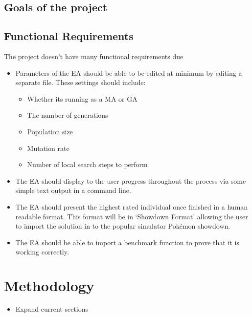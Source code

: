 \documentclass[a4paper]{article}
\newcommand{\Pokemon}{Pok\'{e}mon}
\begin{document}
\subsection{Goals of the project}

\subsection{Functional Requirements}
The project doesn't have many functional requirements due
\begin{itemize}
	\item Parameters of the EA should be able to be edited at minimum by editing a separate file. These settings should include:
	\begin{itemize}
		\item Whether its running as a MA or GA
		\item The number of generations
		\item Population size
		\item Mutation rate
		\item Number of local search steps to perform
	\end{itemize}
	\item The EA should display to the user progress throughout the process via some simple text output in a command line.
	\item The EA should present the highest rated individual once finished in a human readable format. This format will be in `Showdown Format' allowing the user to import the solution in to the popular simulator \Pokemon{} showdown.
	\item The EA should be able to import a benchmark function to prove that it is working correctly.
\end{itemize}

\section{Methodology}
\begin{itemize}
	\item Expand current sections
\end{itemize}
\end{document}
